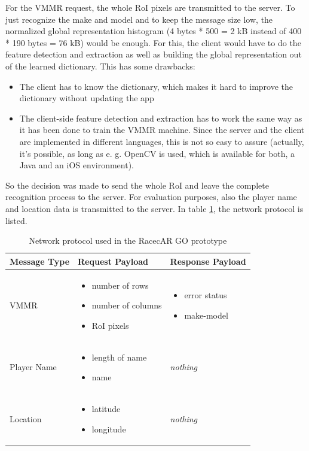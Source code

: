 For the VMMR request, the whole RoI pixels are transmitted to the server. To just recognize the make and model and to keep the message size low, the normalized global representation histogram (4 bytes * 500 = 2 kB instead of 400 * 190 bytes = 76 kB) would be enough. For this, the client would have to do the feature detection and extraction as well as building the global representation out of the learned dictionary. This has some drawbacks:
\begin{itemize}
  \item The client has to know the dictionary, which makes it hard to improve the dictionary without updating the app
  \item The client-side feature detection and extraction has to work the same way as it has been done to train the VMMR machine. Since the server and the client are implemented in different languages, this is not so easy to assure (actually, it's possible, as long as e. g. OpenCV is used, which is available for both, a Java and an iOS environment).
\end{itemize}
So the decision was made to send the whole RoI and leave the complete recognition process to the server. For evaluation purposes, also the player name and location data is transmitted to the server. In table \ref{table:network}, the network protocol is listed.
\begin{table}[btph]
  \centering
  \begin{tabular}{|p{}|p{}|p{}|}
	\hline
	\textbf{Message Type} & \textbf{Request Payload} & \textbf{Response Payload} \\ \hline
	VMMR &
	\begin{itemize}
	\item number of rows
	\item number of columns
	\item RoI pixels
	\end{itemize} &
	\begin{itemize}
	\item error status
	\item make-model
	\end{itemize} \\ \hline
	Player Name &
	\begin{itemize}
	\item length of name
	\item name
	\end{itemize} &
	\emph{nothing} \\ \hline
	Location &
	\begin{itemize}
	\item latitude
	\item longitude
	\end{itemize} &
	\emph{nothing} \\ \hline
  \end{tabular}
  \caption{Network protocol used in the RacecAR GO prototype}
  \label{table:network}
\end{table}


